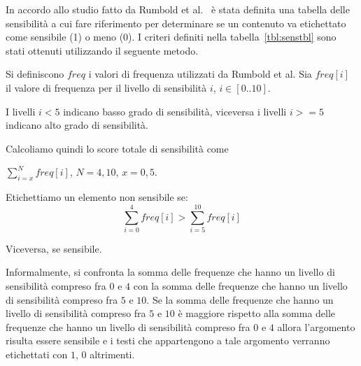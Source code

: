 In accordo allo studio fatto da Rumbold et al.~\cite{dataSpectrum} è stata definita una tabella delle sensibilità a cui fare riferimento per determinare se un contenuto va etichettato come sensibile (1) o meno (0). I criteri definiti nella tabella~\ref{tbl:senstbl} sono stati ottenuti utilizzando il seguente metodo.

Si definiscono $freq$ i valori di frequenza utilizzati da Rumbold et al. Sia $freq[i]$ il valore di frequenza per il livello di sensibilità $i$, $i\in[0..10]$.

I livelli $i<5$ indicano basso grado di sensibilità, viceversa i livelli $i>=5$ indicano alto grado di sensibilità. 

Calcoliamo quindi lo score totale di sensibilità come

$\sum^{N}_{i=x}freq[i]$, $N=4,10$, $x=0,5$. 

Etichettiamo un elemento non sensibile se:
\begin{equation}
\sum^{4}_{i=0}freq[i] > \sum^{10}_{i=5}freq[i]
\end{equation}

Viceversa, se sensibile.

Informalmente, si confronta la somma delle frequenze che hanno un livello di sensibilità compreso fra $0$ e $4$ con la somma delle frequenze che hanno un livello di sensibilità compreso fra $5$ e $10$. Se la somma delle frequenze che hanno un livello di sensibilità compreso fra $5$ e $10$ è maggiore rispetto alla somma delle frequenze che hanno un livello di sensibilità compreso fra $0$ e $4$ allora l'argomento risulta essere sensibile e i testi che appartengono a tale argomento verranno etichettati con $1$, $0$ altrimenti.

